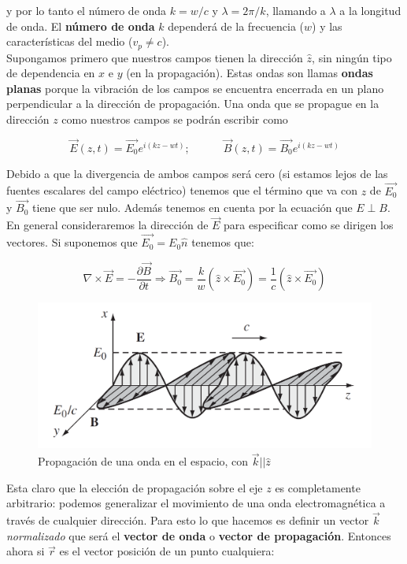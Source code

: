 \documentclass[12pt]{article}
\newcommand{\tquad}{\quad \quad \quad}
\begin{document}
y por lo tanto el número de onda $k = w/c$ y $\lambda = 2 \pi/k$, llamando a $\lambda$ a la longitud de onda. El \textbf{número de onda} $k$ dependerá de la frecuencia ($w$) y las características del medio ($v_p \neq c$). \\


Supongamos primero que nuestros campos tienen la dirección $\widehat{z}$, sin ningún tipo de dependencia en $x$ e $y$ (en la propagación). Estas ondas son llamas \textbf{ondas planas} porque la vibración de los campos se encuentra encerrada en un plano perpendicular a la dirección de propagación. Una onda que se propague en la dirección $z$ como nuestros campos se podrán escribir como

\begin{equation}
\vec{E}(z,t) = \vec{E_0} e^{i(kz-wt)}; \tquad
\vec{B}(z,t) = \vec{B_0} e^{i(kz-wt)}
\end{equation}


Debido a que la divergencia de ambos campos será cero (si estamos lejos de las fuentes escalares del campo eléctrico) tenemos que el término que va con $z$ de $\vec{E_0}$ y $\vec{B_0}$ tiene que ser nulo. Además tenemos en cuenta por la ecuación que $E \perp B$. En general consideraremos la dirección de $\vec{E}$ para especificar como se dirigen los vectores. Si suponemos que $\vec{E_0} = E_0 \widehat{n}$ tenemos que:

$$
\nabla \times \vec{E} = - \dfrac{\partial \vec{B}}{\partial t} \Longrightarrow \vec{B_0} = \dfrac{k}{w} (\widehat{z} \times \vec{E_0}) = \dfrac{1}{c} (\widehat{z} \times \vec{E_0})
$$

\begin{figure}[h!] \centering
\includegraphics[scale=0.4]{ondaselectromagneticas.png}
\caption{Propagación de una onda en el espacio, con $\vec{k} || \widehat{z}$}
\end{figure}

Esta claro que la elección de propagación sobre el eje $z$ es completamente arbitrario: podemos generalizar el movimiento de una onda electromagnética a través de cualquier dirección. Para esto lo que hacemos es definir un vector $\vec{k}$ \textit{normalizado} que será el \textbf{vector de onda} o \textbf{vector de propagación}. Entonces ahora si $\vec{r}$ es el vector posición de un punto cualquiera:
\end{document}
